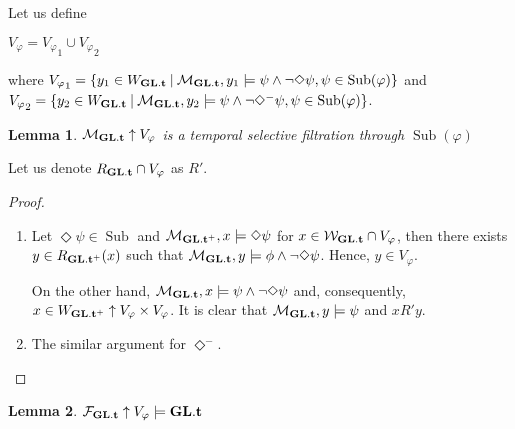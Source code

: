 \documentclass[a4paper]{article}
\theoremstyle{defin}
\theoremstyle{theorem}
\theoremstyle{prop}
\theoremstyle{lemma}
\newtheorem{lemma}{Lemma}
\theoremstyle{ex}
\theoremstyle{col}
\newcommand{\DiamondM}{\Diamond^{-}}
\begin{document}
Let us define

\begin{center}
$V_{\varphi} = {V_{\varphi}}_1 \cup {V_{\varphi}}_2$
\end{center}
where ${V_{\varphi}}_1 = \{ y_1 \in W_{{\bf GL}.{\bf t}} \: | \: \mathcal{M}_{{\bf GL}.{\bf t}}, y_1 \models \psi \land \neg \Diamond \psi, \psi \in
\operatorname{Sub}(\varphi)\}$ and ${V_{\varphi}}_2 = \{ y_2 \in W_{{\bf GL}.{\bf t}} \: | \: \mathcal{M}_{{\bf GL}.{\bf t}}, y_2 \models \psi \land \neg
\DiamondM \psi, \psi \in \operatorname{Sub}(\varphi)\}$.

\begin{lemma}
  $\mathcal{M}_{{\bf GL}.{\bf t}} \uparrow V_{\varphi}$ is a temporal selective filtration through $\operatorname{Sub}(\varphi)$
\end{lemma}

Let us denote $R_{{\bf GL}.{\bf t}} \cap V_{\varphi}$ as $R'$.

\begin{proof}
  $ $

  \begin{enumerate}
    \item Let $\Diamond \psi \in \operatorname{Sub}$ and $\mathcal{M}_{{\bf GL}.{\bf t}^{+}}, x \models \Diamond \psi$ for
    $x \in \mathcal{W}_{{\bf GL}.{\bf t}} \cap V_{\varphi}$, then there exists $y \in R_{{{\bf GL}.{\bf t}^{+}}}(x)$
    such that $\mathcal{M}_{{\bf GL}.{\bf t}}, y \models \phi \land \neg \Diamond \psi$. Hence, $y \in V_{\varphi}$.

    On the other hand, $\mathcal{M}_{{\bf GL}.{\bf t}}, x \models \psi \land \neg \Diamond \psi$ and, consequently, $x \in W_{{{\bf GL}.{\bf t}^{+}}} \uparrow V_{\varphi} \times V_{\varphi}$. It is clear that $\mathcal{M}_{{\bf GL}.{\bf t}}, y \models \psi$ and $x R' y$.
    \item The similar argument for $\DiamondM$.
  \end{enumerate}
\end{proof}

\begin{lemma}
  $\mathcal{F}_{{\bf GL}.{\bf t}} \uparrow V_{\varphi} \models {\bf GL}.{\bf t}$
\end{lemma}
\end{document}
